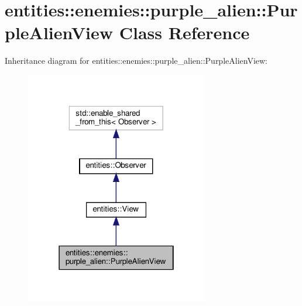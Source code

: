 \hypertarget{classentities_1_1enemies_1_1purple__alien_1_1PurpleAlienView}{}\section{entities\+:\+:enemies\+:\+:purple\+\_\+alien\+:\+:Purple\+Alien\+View Class Reference}
\label{classentities_1_1enemies_1_1purple__alien_1_1PurpleAlienView}


Inheritance diagram for entities\+:\+:enemies\+:\+:purple\+\_\+alien\+:\+:Purple\+Alien\+View\+:\nopagebreak
\begin{figure}[H]
\begin{center}
\leavevmode
\includegraphics[width=226pt]{classentities_1_1enemies_1_1purple__alien_1_1PurpleAlienView__inherit__graph}
\end{center}
\end{figure}


